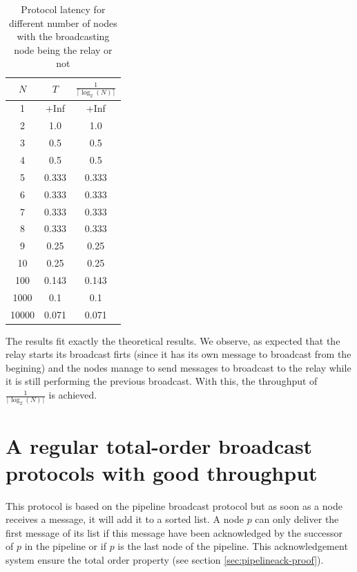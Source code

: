 \documentclass[a4paper]{article}
\begin{document}
\begin{table}[H]
\centering
\begin{tabular}{|c|c|c|}
    \hline
    $N$   & $T$  & $\frac{1}{\lceil\log_2(N)\rceil}$ \\
    \hline
    1     & +Inf   & +Inf   \\
    2     & 1.0    & 1.0    \\
    3     & 0.5    & 0.5    \\
    4     & 0.5    & 0.5    \\
    5     & 0.333  & 0.333  \\
    6     & 0.333  & 0.333  \\
    7     & 0.333  & 0.333  \\
    8     & 0.333  & 0.333  \\
    9     & 0.25   & 0.25   \\
    10    & 0.25   & 0.25   \\
    100   & 0.143  & 0.143  \\
    1000  & 0.1    & 0.1    \\
    10000 & 0.071  & 0.071  \\
    \hline
\end{tabular}
\caption{Protocol latency for different number of nodes with the broadcasting node being the relay or not}
\label{table:thr}
\end{table}

The results fit exactly the theoretical results. We observe, as expected that
the relay starts its broadcast firts (since it has its own message to
broadcast from the begining) and the nodes manage to send messages to
broadcast to the relay while it is still performing the previous broadcast.
With this, the throughput of $\frac{1}{\lceil\log_2(N)\rceil}$ is achieved.

\section{A regular total-order broadcast protocols with good throughput}
\label{sec:throughputTO}

This protocol is based on the pipeline broadcast protocol but as soon as a node
receives a message, it will add it to a sorted list. A node $p$ can only deliver the
first message of its list if this message have been acknowledged by the
successor of $p$ in the pipeline or if $p$ is the last node of the pipeline.
This acknowledgement system ensure the total order property (see section
\ref{sec:pipelineack-proof}).
\end{document}
